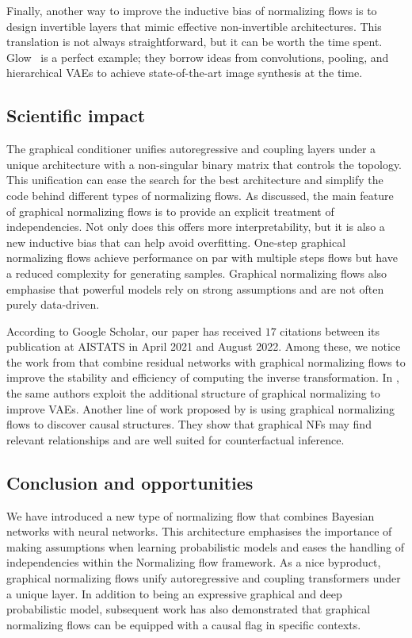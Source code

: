 Finally, another way to improve the inductive bias of normalizing flows is to design invertible layers that mimic effective non-invertible architectures. This translation is not always straightforward, but it can be worth the time spent. Glow~\citep{kingma_glow_2018} is a perfect example; they borrow ideas from convolutions, pooling, and hierarchical VAEs to achieve state-of-the-art image synthesis at the time.




\subsection{Scientific impact}
The graphical conditioner unifies autoregressive and coupling layers under a unique architecture with a non-singular binary matrix that controls the topology. This unification can ease the search for the best architecture and simplify the code behind different types of normalizing flows. As discussed, the main feature of graphical normalizing flows is to provide an explicit treatment of independencies. Not only does this offers more interpretability, but it is also a new inductive bias that can help avoid overfitting. One-step graphical normalizing flows achieve performance on par with multiple steps flows but have a reduced complexity for generating samples. Graphical normalizing flows also emphasise that powerful models rely on strong assumptions and are not often purely data-driven.

According to Google Scholar, our paper has received $17$ citations between its publication at AISTATS in April 2021 and August 2022. Among these, we notice the work from \citet{mouton2022graphical} that combine residual networks with graphical normalizing flows to improve the stability and efficiency of computing the inverse transformation. In \citet{mouton2022siren}, the same authors exploit the additional structure of graphical normalizing to improve VAEs. Another line of work proposed by \citet{balgi2022personalized} is using graphical normalizing flows to discover causal structures. They show that graphical NFs may find relevant relationships and are well suited for counterfactual inference.

\subsection{Conclusion and opportunities}
We have introduced a new type of normalizing flow that combines Bayesian networks with neural networks. This architecture emphasises the importance of making assumptions when learning probabilistic models and eases the handling of independencies within the Normalizing flow framework. As a nice byproduct, graphical normalizing flows unify autoregressive and coupling transformers under a unique layer. In addition to being an expressive graphical and deep probabilistic model, subsequent work has also demonstrated that graphical normalizing flows can be equipped with a causal flag in specific contexts.

